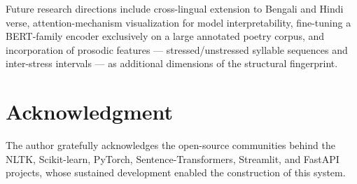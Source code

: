 \documentclass[conference]{IEEEtran}
\begin{document}
Future research directions include cross-lingual extension to Bengali and
Hindi verse, attention-mechanism visualization for model interpretability,
fine-tuning a BERT-family encoder exclusively on a large annotated poetry
corpus, and incorporation of prosodic features --- stressed/unstressed
syllable sequences and inter-stress intervals --- as additional
dimensions of the structural fingerprint.

\section*{Acknowledgment}

The author gratefully acknowledges the open-source communities behind the
NLTK, Scikit-learn, PyTorch, Sentence-Transformers, Streamlit, and
FastAPI projects, whose sustained development enabled the construction of
this system.
\end{document}
